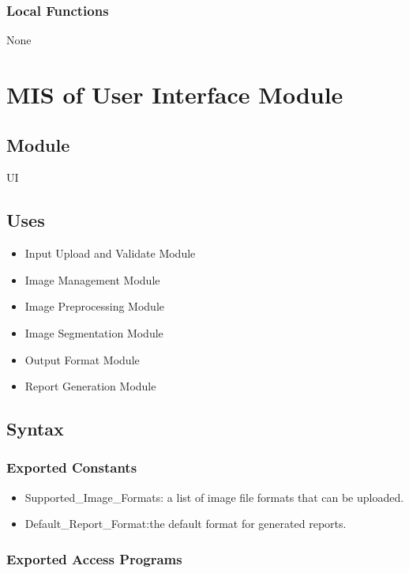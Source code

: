 \documentclass[12pt, titlepage]{article}
\begin{document}
\subsubsection{Local Functions}
None









\newpage


\section{MIS of User Interface Module} \label{m7} 

\subsection{Module}

UI

\subsection{Uses}

\begin{itemize}
    \item Input Upload and Validate Module
    \item Image Management Module
    \item Image Preprocessing Module
    \item Image Segmentation Module
    \item Output Format Module
    \item Report Generation Module
\end{itemize}

\subsection{Syntax}

\subsubsection{Exported Constants}
\begin{itemize}
    \item Supported\_Image\_Formats: a list of image file formats that can be uploaded.
    \item Default\_Report\_Format:the default format for generated reports.
\end{itemize}
\subsubsection{Exported Access Programs}
\end{document}
